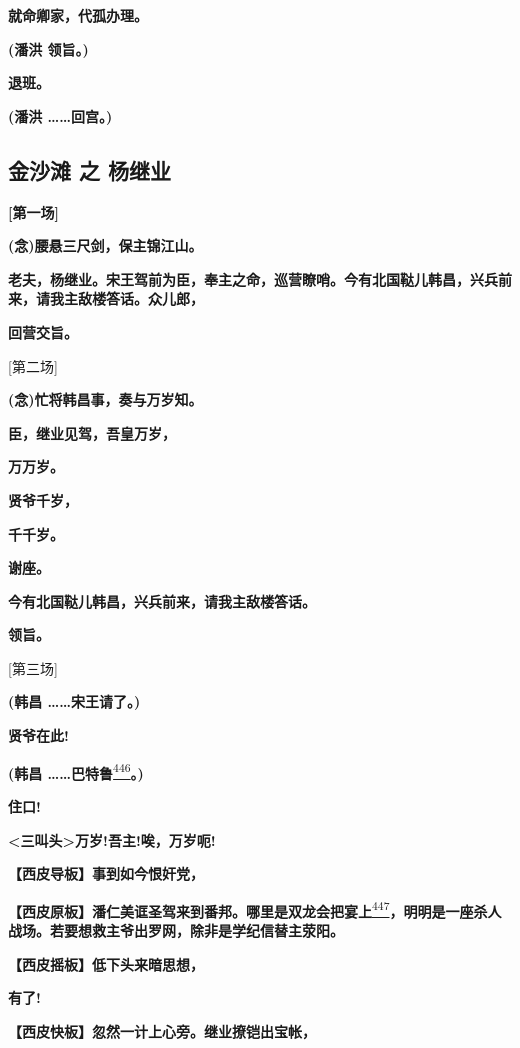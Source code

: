 \textbf{就命卿家，代孤办理。}

\textbf{(潘洪 领旨。)}

\textbf{退班。}

\textbf{(潘洪 \ldots{}\ldots{}回宫。)}

\newpage
\hypertarget{ux91d1ux6c99ux6ee9-ux4e4b-ux6768ux7ee7ux4e1a}{%
\subsection{金沙滩 之
杨继业}\label{ux91d1ux6c99ux6ee9-ux4e4b-ux6768ux7ee7ux4e1a}}

\textbf{{[}第一场{]}}

\textbf{(念)腰悬三尺剑，保主锦江山。}

\textbf{老夫，杨继业。宋王驾前为臣，奉主之命，巡营瞭哨。今有北国鞑儿韩昌，兴兵前来，请我主敌楼答话。众儿郎，}

\textbf{回营交旨。}

{[}第二场{]}

\textbf{(念)忙将韩昌事，奏与万岁知。}

\textbf{臣，继业见驾，吾皇万岁，}

\textbf{万万岁。}

\textbf{贤爷千岁，}

\textbf{千千岁。}

\textbf{谢座。}

\textbf{今有北国鞑儿韩昌，兴兵前来，请我主敌楼答话。}

\textbf{领旨。}

{[}第三场{]}

\textbf{(韩昌 \ldots{}\ldots{}宋王请了。)}

\textbf{贤爷在此!}

\textbf{(韩昌
\ldots{}\ldots{}巴特鲁}\protect\hyperlink{fn446}{\textsuperscript{446}}\textbf{。)}

\textbf{住口!}

\textbf{\textless{}三叫头\textgreater{}万岁!吾主!唉，万岁呃!}

\textbf{【西皮导板】事到如今恨奸党，}

\textbf{【西皮原板】潘仁美诓圣驾来到番邦。哪里是双龙会把宴上}\protect\hyperlink{fn447}{\textsuperscript{447}}\textbf{，明明是一座杀人战场。若要想救主爷出罗网，除非是学纪信替主荥阳。}

\textbf{【西皮摇板】低下头来暗思想，}

\textbf{有了!}

\textbf{【西皮快板】忽然一计上心旁。继业撩铠出宝帐，}

